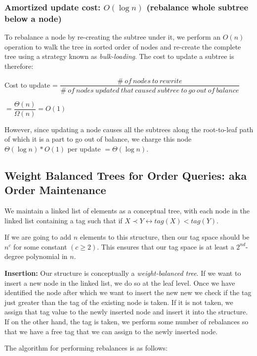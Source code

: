 \documentclass{article}
\begin{document}
\subsubsection{Amortized update cost: $O(\log{n})$ (rebalance whole subtree below a node)}

To rebalance a node by re-creating the subtree under it, we perform an
$O(n)$ operation to walk the tree in sorted order of nodes and
re-create the complete tree using a strategy known as
\textit{bulk-loading}. The cost to update a subtree is therefore:

Cost to update =
$\dfrac{\#\ of\ nodes\ to\ rewrite}{\#\ of\ nodes\ updated\ that\ caused\ subtree\ to\ go\ out\ of\ balance}$

$=\dfrac{\Theta(n)}{\Omega(n)} = O(1)$

However, since updating a node causes all the subtrees along the
root-to-leaf path of which it is a part to go out of balance, we
charge this node $\Theta(\log{n}) * O(1)$ per update
$=\Theta(\log{n})$.

\clearpage

\subsection{Weight Balanced Trees for Order Queries: aka Order
  Maintenance}

We maintain a linked list of elements as a conceptual tree, with each
node in the linked list containing a tag such that if $X \prec Y
\leftrightarrow tag(X) < tag(Y)$.

If we are going to add $n$ elements to this structure, then our tag
space should be $n^c$ for some constant $(c \ge 2)$. This ensures that
our tag space is at least a $2^{nd}$-degree polynomial in $n$.

\textbf{Insertion:} Our structure is conceptually a
\textit{weight-balanced tree}. If we want to insert a new node in the
linked list, we do so at the leaf level. Once we have identified the
node after which we want to insert the new new we check if the tag
just greater than the tag of the existing node is taken. If it is not
taken, we assign that tag value to the newly inserted node and insert
it into the structure. If on the other hand, the tag is taken, we
perform some number of rebalances so that we have a free tag that we
can assign to the newly inserted node.

The algorithm for performing rebalances is as follows:
\end{document}
